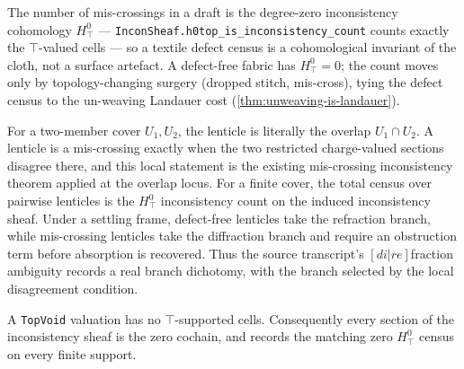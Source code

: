 \begin{theorem}\label{thm:defect-count-is-h0top}\leanok{}
The number of mis-crossings in a draft is
the degree-zero inconsistency cohomology $H^0_{\top}$ --- \texttt{InconSheaf.h0top\_is\_inconsistency\_count}
counts exactly the $\top$-valued cells --- so a textile defect census is a cohomological
invariant of the cloth, not a surface artefact. A defect-free fabric has $H^0_{\top}=0$; the
count moves only by topology-changing surgery (dropped stitch, mis-cross), tying the defect
census to the un-weaving Landauer cost (\cref{thm:unweaving-is-landauer}).
\end{theorem}

\begin{theorem}\label{thm:lenticle-identification}\notready{}
For a two-member cover \(U_1,U_2\), the lenticle is literally the
overlap \(U_1\cap U_2\).  A lenticle is a mis-crossing exactly when the two
restricted charge-valued sections disagree there, and this local statement is
the existing mis-crossing inconsistency theorem applied at the overlap locus.
For a finite cover, the total census over pairwise lenticles is the
\(H^0_{\top}\) inconsistency count on the induced inconsistency sheaf.  Under a
settling frame, defect-free lenticles take the refraction branch, while
mis-crossing lenticles take the diffraction branch and require an obstruction
term before absorption is recovered.  Thus the source transcript's
\([di|re]\)fraction ambiguity records a real branch dichotomy, with the branch
selected by the local disagreement condition.
\end{theorem}

\begin{theorem}\label{thm:top-void-zero}\leanok{}
A \texttt{TopVoid} valuation has no $\top$-supported cells.  Consequently every
section of the inconsistency sheaf is the zero cochain, and
\leanok records the matching
zero $H^0_{\top}$ census on every finite support.
\end{theorem}

